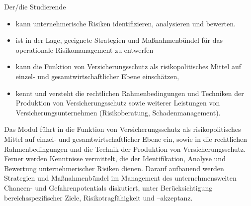 \begin{module}
\begin{styleenv}
\begin{conditions}
\end{conditions}


\end{styleenv}

\begin{learningoutcomes}
Der/die Studierende

 \begin{itemize}\item kann unternehmerische Risiken identifizieren, analysieren und bewerten.  \item ist in der Lage, geeignete Strategien und Maßnahmenbündel für das operationale Risikomanagement zu entwerfen  \item kann die Funktion von Versicherungsschutz als risikopolitisches Mittel auf einzel- und gesamtwirtschaftlicher Ebene einschätzen,  \item kennt und versteht die rechtlichen Rahmenbedingungen und Techniken der Produktion von Versicherungsschutz sowie weiterer Leistungen von Versicherungsunternehmen (Risikoberatung, Schadenmanagement).  \end{itemize}
\end{learningoutcomes}

\begin{content}
Das Modul führt in die Funktion von Versicherungsschutz als risikopolitisches Mittel auf einzel- und gesamtwirtschaftlicher Ebene ein, sowie in die rechtlichen Rahmenbedingungen und die Technik der Produktion von Versicherungsschutz. Ferner werden Kenntnisse vermittelt, die der Identifikation, Analyse und Bewertung unternehmerischer Risiken dienen. Darauf aufbauend werden Strategien und Maßnahmenbündel im Management des unternehmensweiten Chancen- und Gefahrenpotentials diskutiert, unter Berücksichtigung bereichsspezifischer Ziele, Risikotragfähigkeit und –akzeptanz.


\end{content}



\end{module}

